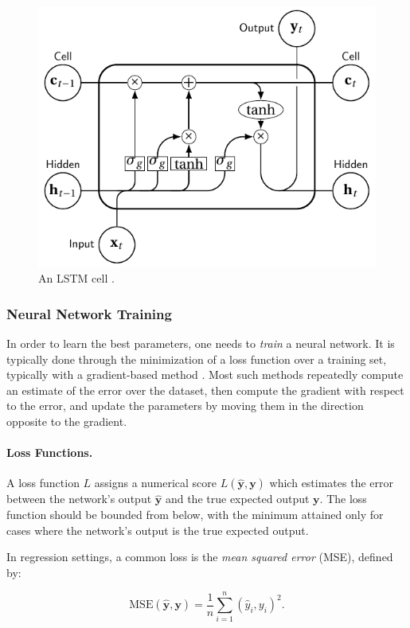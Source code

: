 \begin{figure}[h!]
    \centering
    \includegraphics[width=0.75\columnwidth]{chapter2/pictures/lstm_cell.pdf}
    \caption{An LSTM cell \citep{vAnswerHowDraw2018}.}
    \label{fig:lstm}
\end{figure}

\subsubsection{Neural Network Training}
In order to learn the best parameters, one needs to \emph{train} a neural network. It is typically done through the minimization of a loss function over a training set, typically with a gradient-based method \citep{goldberg2016primer}. Most such methods repeatedly compute an estimate of the error over the dataset, then compute the gradient with respect to the error, and update the parameters by moving them in the direction opposite to the gradient.

\paragraph{Loss Functions.}
A loss function $L$ assigns a numerical score $L(\hat{\mathbf{y}}, \mathbf{y})$ which estimates the error between the network's output $\hat{\mathbf{y}}$ and the true expected output $\mathbf{y}$. The loss function should be bounded from below, with the minimum attained only for cases where the network's output is the true expected output.

In regression settings, a common loss is the \emph{mean squared error} (\textsc{MSE}), defined by:

\[ \textrm{MSE}(\hat{\mathbf{y}}, \mathbf{y}) = \frac{1}{n} \sum_{i=1}^n (\hat{y}_i, y_i)^2 . \]

